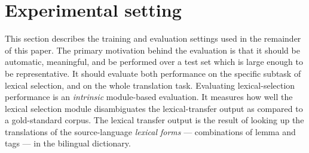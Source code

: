 \documentclass[11pt]{article}
\begin{document}
%   


\section{Experimental setting}

This section describes the training and evaluation settings used in
the remainder of this paper. The primary motivation behind the
evaluation is that it should be automatic, meaningful, and be performed over a test set which
is large enough to be representative. It should evaluate both
performance on the specific subtask of lexical selection, and on the
whole translation task. Evaluating lexical-selection performance is an
\emph{intrinsic} module-based evaluation.  It measures how well the lexical
selection module disambiguates the lexical-transfer
output as compared to a gold-standard corpus. The lexical 
transfer output is the result of looking up the translations of the 
source-language \emph{lexical forms} --- combinations of lemma and 
tags --- in the bilingual dictionary.
\end{document}
